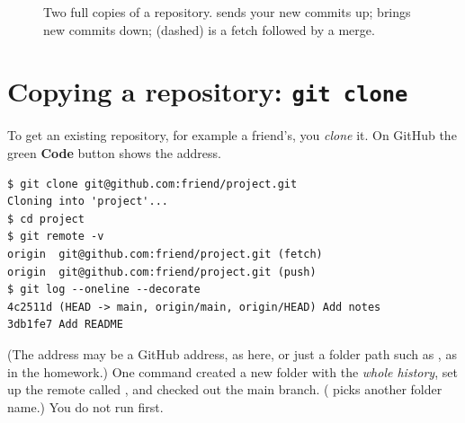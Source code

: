 \begin{figure}[H]
\centering
{}
\caption{Two full copies of a repository.  sends your new commits up;  brings new commits down;  (dashed) is a fetch followed by a merge.}
\label{fig:remote}
\end{figure}

\section{Copying a repository: \texttt{git clone}}

To get an existing repository, for example a friend's, you \emph{clone} it. On GitHub the green \textbf{Code} button shows the address.

\begin{lstlisting}
$ git clone git@github.com:friend/project.git
Cloning into 'project'...
$ cd project
$ git remote -v
origin  git@github.com:friend/project.git (fetch)
origin  git@github.com:friend/project.git (push)
$ git log --oneline --decorate
4c2511d (HEAD -> main, origin/main, origin/HEAD) Add notes
3db1fe7 Add README
\end{lstlisting}

(The address may be a GitHub address, as here, or just a folder path such as , as in the homework.) One command created a new folder with the \emph{whole history}, set up the remote called , and checked out the main branch. ( picks another folder name.) You do not run  first.

